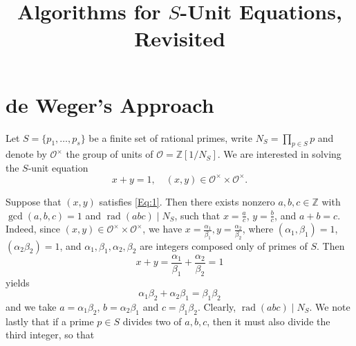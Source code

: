 \documentclass[11pt]{article}
\title{Algorithms for $S$-Unit Equations, Revisited}
\author{}
\theoremstyle{definition}
\DeclareMathOperator{\rad}{rad}
\begin{document}
\maketitle


\section{de Weger's Approach}

Let $S = \{p_1, \dots, p_s\}$ be a finite set of rational primes, write $N_S = \prod_{p \in S} p$ and denote by $\mathcal{O}^{\times}$ the group of units of $\mathcal{O} = \mathbb{Z}[1/N_S]$. We are interested in solving the $S$-unit equation
\begin{equation} \label{Eq:1}
x + y = 1, \quad (x,y) \in \mathcal{O}^{\times} \times \mathcal{O}^\times.
\end{equation}

Suppose that $(x,y)$ satisfies \eqref{Eq:1}. Then there exists nonzero $a,b,c \in \mathbb{Z}$ with $\gcd(a,b,c) = 1$ and $\rad(abc) \mid N_S$, such that $x = \frac{a}{c}$, $y = \frac{b}{c}$, and $a + b = c$. Indeed, since $(x,y) \in \mathcal{O}^{\times} \times \mathcal{O}^\times$, we have $x = \frac{\alpha_1}{\beta_1}, y = \frac{\alpha_2}{\beta_2}$, where $(\alpha_1, \beta_1) = 1$, $(\alpha_2 \beta_2) = 1$, and $\alpha_1, \beta_1, \alpha_2, \beta_2$ are integers composed only of primes of $S$. Then
\[x + y = \frac{\alpha_1}{\beta_1} + \frac{\alpha_2}{\beta_2} = 1\]
yields 
\[\alpha_1 \beta_2 + \alpha_2 \beta_1 = \beta_1 \beta_2\]
and we take $a = \alpha_1 \beta_2$, $b = \alpha_2 \beta_1$ and $c = \beta_1 \beta_2$. Clearly, $\rad(abc) \mid N_S$. We note lastly that if a prime $p \in S$ divides two of $a,b,c$, then it must also divide the third integer, so that 
\end{document}
